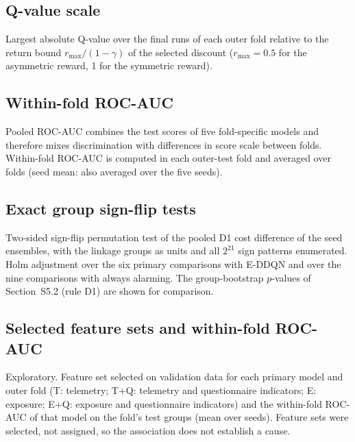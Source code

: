 \begin{center}\footnotesize
\resizebox{\textwidth}{!}{}
\end{center}

\subsection{Q-value scale}
Largest absolute Q-value over the final runs of each outer fold relative to the return bound $r_{\max}/(1-\gamma)$ of the selected discount ($r_{\max}=0.5$ for the asymmetric reward, 1 for the symmetric reward).

\begin{center}\footnotesize

\end{center}

\subsection{Within-fold ROC-AUC}
Pooled ROC-AUC combines the test scores of five fold-specific models and therefore mixes discrimination with differences in score scale between folds. Within-fold ROC-AUC is computed in each outer-test fold and averaged over folds (seed mean: also averaged over the five seeds).

\begin{center}\footnotesize

\end{center}

\subsection{Exact group sign-flip tests}
Two-sided sign-flip permutation test of the pooled D1 cost difference of the seed ensembles, with the \nGroupsEval{} linkage groups as units and all $2^{21}$ sign patterns enumerated. Holm adjustment over the six primary comparisons with E-DDQN and over the nine comparisons with always alarming. The group-bootstrap $p$-values of Section~S5.2 (rule D1) are shown for comparison.

\begin{center}\footnotesize
\resizebox{\textwidth}{!}{}
\end{center}

\subsection{Selected feature sets and within-fold ROC-AUC}
Exploratory. Feature set selected on validation data for each primary model and outer fold (T: telemetry; T+Q: telemetry and questionnaire indicators; E: exposure; E+Q: exposure and questionnaire indicators) and the within-fold ROC-AUC of that model on the fold's test groups (mean over seeds). Feature sets were selected, not assigned, so the association does not establish a cause.

